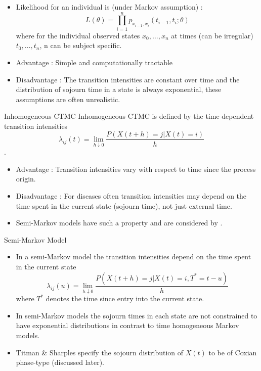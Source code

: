 \documentclass{beamer}
\begin{document}
\begin{frame}
\begin{itemize}
\item Likelihood for an individual is (under Markov  assumption) :
\[
L(\theta) = \prod_{i=1}^n p_{x_{i-1},x_i} (t_{i-1},t_i;\theta)
\] where for the individual observed states $x_0 ,\ldots, x_n$ at times (can be irregular) $t_0,\ldots,t_n$, n can be subject specific.
\end{itemize}
\end{frame}
\begin{frame}
\begin{itemize}
\item Advantage : Simple and computationally tractable
\item Disadvantage : The transition intensities are constant over time and the distribution of sojourn time in a state is always exponential, these assumptions are often unrealistic.
\end{itemize}
\end{frame}
\begin{frame}{Inhomogeneous CTMC}
Inhomogeneous CTMC is defined by the time dependent transition intensities \[\lambda_{ij}(t)=\lim_{h \downarrow 0} \frac{P(X(t+h)=j|X(t)=i)}{h}\].

\begin{itemize}
\item Advantage : Transition intensities vary with respect to time since the process origin.
\item Disadvantage : For diseases often transition intensities may depend on the time spent in the current state (sojourn time), not just external time.
\item Semi-Markov models have such a property and are considered by \cite{titman2010semi} \citep{cox1965theory,mcgllchrist1991semi}.
\end{itemize}
\end{frame}
\begin{frame}{Semi-Markov Model}
\begin{itemize}
\item In a semi-Markov model the transition intensities depend on the time spent in the current state
\[
\lambda_{ij} (u) = \lim_{h \downarrow 0} \frac{P(X(t+h) = j | X(t) = i, T^* = t-u)}{h}
\] where $T^*$ denotes the time since entry into the current state.
\item In semi-Markov models the sojourn times in each state are not constrained to have exponential distributions in contrast to time homogeneous Markov models. 
\item Titman \& Sharples specify the sojourn distribution of $X(t)$ to be of Coxian phase-type (discussed later).
\end{itemize}
\end{frame}
\end{document}

